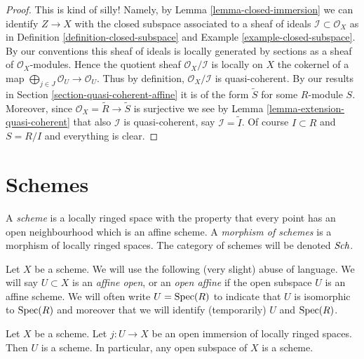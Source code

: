\begin{proof}
This is kind of silly! Namely, by Lemma \ref{lemma-closed-immersion}
we can identify $Z \to X$ with the closed subspace associated to
a sheaf of ideals $\mathcal{I} \subset \mathcal{O}_X$ as in
Definition \ref{definition-closed-subspace} and
Example \ref{example-closed-subspace}.
By our conventions this sheaf of ideals is locally generated
by sections as a sheaf of $\mathcal{O}_X$-modules.
Hence the quotient sheaf $\mathcal{O}_X / \mathcal{I}$
is locally on $X$ the cokernel
of a map $\bigoplus_{j \in J} \mathcal{O}_U \to \mathcal{O}_U$.
Thus by definition, $\mathcal{O}_X / \mathcal{I}$ is quasi-coherent.
By our results in Section \ref{section-quasi-coherent-affine}
it is of the form $\widetilde S$ for some $R$-module $S$.
Moreover, since $\mathcal{O}_X = \widetilde R \to \widetilde S$
is surjective we see by Lemma \ref{lemma-extension-quasi-coherent}
that also $\mathcal{I}$ is quasi-coherent, say $\mathcal{I} = \widetilde I$.
Of course $I \subset R$ and $S = R/I$ and everything is clear.
\end{proof}













\section{Schemes}
\label{section-schemes}

\begin{definition}
\label{definition-scheme}
A {\it scheme} is a locally ringed space with the property that
every point has an open neighbourhood which is an affine scheme.
A {\it morphism of schemes} is a morphism of locally
ringed spaces. The category of schemes will be denoted
$\textit{Sch}$.
\end{definition}

\noindent
Let $X$ be a scheme.
We will use the following (very slight) abuse of language.
We will say $U \subset X$ is an {\it affine open}, or an {\it open affine}
if the open subspace $U$ is an affine scheme. We will often
write $U = \mathop{\rm Spec}(R)$ to indicate that $U$ is isomorphic
to $\mathop{\rm Spec}(R)$ and moreover that we will identify (temporarily)
$U$ and $\mathop{\rm Spec}(R)$.

\begin{lemma}
\label{lemma-open-subspace-scheme}
Let $X$ be a scheme. Let $j : U \to X$ be an open immersion
of locally ringed spaces. Then $U$ is a scheme. In particular,
any open subspace of $X$ is a scheme.
\end{lemma}

